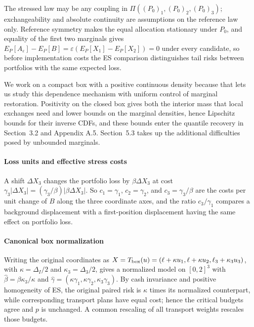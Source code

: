 The stressed law may be any coupling in \(\Pi((P_0)_1,(P_0)_2,(P_0)_3)\); exchangeability and absolute continuity are assumptions on the reference law only. Reference symmetry makes the equal allocation stationary under \(P_0\), and equality of the first two marginals gives \(E_P[A_\varepsilon]-E_P[B]=\varepsilon(E_P[X_1]-E_P[X_2])=0\) under every candidate, so before implementation costs the ES comparison distinguishes tail risks between portfolios with the same expected loss.

We work on a compact box with a positive continuous density because that lets us study this dependence mechanism with uniform control of marginal restoration. Positivity on the closed box gives both the interior mass that local exchanges need and lower bounds on the marginal densities, hence Lipschitz bounds for their inverse CDFs, and these bounds enter the quantile recovery in Section~3.2 and Appendix A.5. Section~5.3 takes up the additional difficulties posed by unbounded marginals.

\paragraph{Loss units and effective stress costs}\label{par:effective-costs}
A shift \(\Delta X_3\) changes the portfolio loss by \(\beta\Delta X_3\) at cost \(\gamma_3|\Delta X_3|=(\gamma_3/\beta)|\beta\Delta X_3|\). So \(c_1=\gamma_1\), \(c_2=\gamma_2\), and \(c_3=\gamma_3/\beta\) are the costs per unit change of \(B\) along the three coordinate axes, and the ratio \(c_3/\gamma_1\) compares a background displacement with a first-position displacement having the same effect on portfolio loss.

\paragraph{Canonical box normalization} Writing the original coordinates as \(X=T_{\rm box}(u)=(\ell+\kappa u_1,\ell+\kappa u_2,\ell_3+\kappa_3u_3)\), with \(\kappa=\Delta_I/2\) and \(\kappa_3=\Delta_3/2\), gives a normalized model on \([0,2]^3\) with \(\widehat\beta=\beta\kappa_3/\kappa\) and \(\widehat\gamma=(\kappa\gamma_1,\kappa\gamma_2,\kappa_3\gamma_3)\). By cash invariance and positive homogeneity of ES, the original paired risk is \(\kappa\) times its normalized counterpart, while corresponding transport plans have equal cost; hence the critical budgets agree and \(p\) is unchanged. A common rescaling of all transport weights rescales those budgets.

